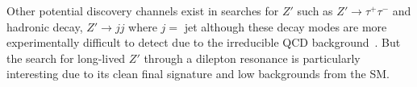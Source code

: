 Other potential discovery channels exist in searches for $Z'$ such as $Z' \rightarrow \tau^{+}\tau^{-}$ and hadronic decay, $Z' \rightarrow jj$ where $j =$ jet although these decay modes are more experimentally difficult to detect due to the irreducible QCD background~\cite{Aaboud:2017yvp,Sirunyan:2016iap}. But the search for long-lived $Z'$ through a dilepton resonance is particularly interesting due to its clean final signature and low backgrounds from the SM.

